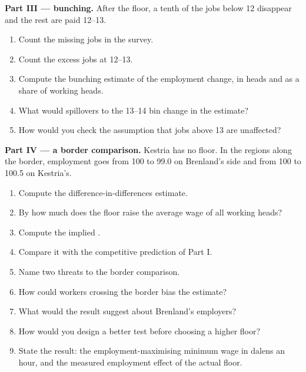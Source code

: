 \begin{problem}
\medskip\noindent\textbf{Part III --- bunching.} After the floor, a tenth of the jobs
below 12 disappear and the rest are paid 12--13.
\begin{enumerate}[resume]
\item Count the missing jobs in the survey.
\item Count the excess jobs at 12--13.
\item Compute the bunching estimate of the employment change, in heads and as a share
of working heads.
\item What would spillovers to the 13--14 bin change in the estimate?
\item How would you check the assumption that jobs above 13 are unaffected?
\end{enumerate}

\medskip\noindent\textbf{Part IV --- a border comparison.} Kestria has no floor. In the
regions along the border, employment goes from 100 to 99.0 on Brenland's side and from 100
to 100.5 on Kestria's.
\begin{enumerate}[resume]
\item Compute the difference-in-differences estimate.
\item By how much does the floor raise the average wage of all working heads?
\item Compute the implied .
\item Compare it with the competitive prediction of Part I.
\item Name two threats to the border comparison.
\item How could workers crossing the border bias the estimate?
\item What would the result suggest about Brenland's employers?
\item How would you design a better test before choosing a higher floor?
\item State the result: the employment-maximising minimum wage in dalens an hour, and the
measured employment effect of the actual floor.
\end{enumerate}
\end{problem}
